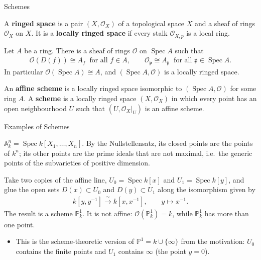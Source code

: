 \documentclass[10pt,aspectratio=1610]{beamer}
\DeclareMathOperator{\Spec}{Spec}
\newcommand{\OO}{\mathcal{O}}
\newcommand{\A}{\mathbb{A}}
\newcommand{\PP}{\mathbb{P}}
\newcommand{\pp}{\mathfrak{p}}
\begin{document}
    \begin{frame}{Schemes}
        \begin{definition}
            A \textbf{ringed space} is a pair $(X, \OO_X)$ of a topological space $X$ and a sheaf of rings $\OO_X$ on $X$. It is a \textbf{locally ringed space} if every stalk $\OO_{X,p}$ is a local ring.
        \end{definition}
        \begin{theorem}[Structure sheaf of $\Spec A$]
            Let $A$ be a ring. There is a sheaf of rings $\OO$ on $\Spec A$ such that
            \begin{align*}
                \OO(D(f)) \cong A_f \ \text{ for all } f \in A, \qquad \OO_{\pp} \cong A_{\pp} \ \text{ for all } \pp \in \Spec A.
            \end{align*}
            In particular $\OO(\Spec A) \cong A$, and $(\Spec A, \OO)$ is a locally ringed space.
        \end{theorem}
        \begin{definition}[Scheme]
            An \textbf{affine scheme} is a locally ringed space isomorphic to $(\Spec A, \OO)$ for some ring $A$. A \textbf{scheme} is a locally ringed space $(X, \OO_X)$ in which every point has an open neighbourhood $U$ such that $(U, \OO_X|_U)$ is an affine scheme.
        \end{definition}
    \end{frame}

    \begin{frame}{Examples of Schemes}
        \begin{example}
            $\A^n_k = \Spec k[X_1, \ldots, X_n]$. By the Nullstellensatz, its closed points are the points of $k^n$; its other points are the prime ideals that are not maximal, i.e.\ the generic points of the subvarieties of positive dimension.
        \end{example}
        \begin{example}
            Take two copies of the affine line, $U_0 = \Spec k[x]$ and $U_1 = \Spec k[y]$, and glue the open sets $D(x) \subset U_0$ and $D(y) \subset U_1$ along the isomorphism given by
            \begin{align*}
                k[y, y^{-1}] \xrightarrow{\ \sim\ } k[x, x^{-1}], \qquad y \mapsto x^{-1}.
            \end{align*}
            The result is a scheme $\PP^1_k$. It is not affine: $\OO(\PP^1_k) = k$, while $\PP^1_k$ has more than one point.
        \end{example}
        \begin{itemize}
            \item This is the scheme-theoretic version of $\PP^1 = k \cup \{\infty\}$ from the motivation: $U_0$ contains the finite points and $U_1$ contains $\infty$ (the point $y = 0$).
        \end{itemize}
    \end{frame}
\end{document}
